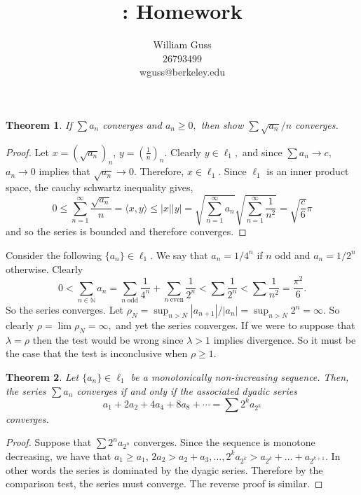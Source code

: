 \documentclass[letter]{article}
\title{\bCLASS: Homework \bHWN}
\author{William Guss\\26793499\\wguss@berkeley.edu}
\newtheorem{theorem}{Theorem}
\newenvironment{menumerate}{%
  \edef\backupindent{\the\parindent}%
  \enumerate%
  \setlength{\parindent}{\backupindent}%
}{\endenumerate}
\begin{document}
\maketitle
\thispagestyle{empty}

	\begin{menumerate}
		\setcounter{enumi}{58}
		\item %

		\begin{theorem}
			If $\sum a_n$ converges and $a_n \geq 0,$ then show $\sum \sqrt{a_n}/n$ converges.
		\end{theorem}

		\begin{proof}
			Let $x = (\sqrt{a_n})_n$, $y = \left(\frac{1}{n}\right)_n$. Clearly $y \in \ell_1,$ and since $\sum a_n \to c,$ $a_n \to 0$ implies that $\sqrt{a_n} \to 0.$ Therefore, $x \in \ell_1.$ Since $\ell_1$ is an inner product space, the cauchy schwartz inequality gives, 
			$$0 \leq \sum_{n=1}^\infty \frac{\sqrt{a_n}}{n} = \langle x,y \rangle \leq |x||y| = \sqrt{\sum_{n=1}^\infty a_n} \sqrt{\sum_{n=1}^\infty \frac{1}{n^2}} = \sqrt{\frac{c}{6}}\pi$$
			and so the series is bounded and therefore converges.
		\end{proof}

		\setcounter{enumi}{60}
		\item Consider the following $\{a_n\} \in \ell_1.$ We say that $a_n = 1/4^n$ if $n$ odd and $a_n = 1/2^n$ otherwise. Clearly $$0 < \sum_{n\in\mathbb{N}}a_n = \sum_{n\ \text{odd}} \frac{1}{4^n} + \sum_{n\ \text{even}} \frac{1}{2^n} < \sum \frac{1}{2^n} < \sum \frac{1}{n^2} = \frac{\pi^2}{6}.$$ So the series converges. Let $\rho_N = \sup_{n>N} |a_{n+1}|/|a_n| = \sup_{n>N} 2^n = \infty$. So clearly $\rho = \lim \rho_N = \infty,$ and yet the series converges. If we were to suppose that $\lambda = \rho$ then the test would be wrong since $\lambda > 1$ implies divergence. So it must be the case that the test is inconclusive when $\rho \geq 1.$

		\item 
		\begin{theorem}
			Let $\{a_n\} \in \ell_1$ be a monotonically non-increasing sequence. Then, the series $\sum a_n$ converges if and only if the associated dyadic series 
			$$a_1 + 2a_2 +4a_4 + 8a_8 + \cdots = \sum 2^k a_{2^k}$$
			converges.
		\end{theorem}

		\begin{proof}
		Suppose that $\sum 2^na_{2^n}$ converges. Since the sequence is monotone decreasing, we have that $a_1 \geq a_1$, $2a_2 > a_2 + a_3, \dots, 2^ka_{2^k} > a_{2^k} + \dots + a_{2^{k+1}}.$ In other words the series is dominated by the dyagic series. Therefore by the comparison test, the series must converge. The reverse proof is similar.
		\end{proof}


\end{menumerate}
\end{document}
